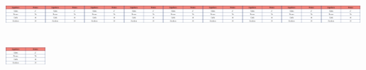 \includegraphics[width=0.57930in,height=0.57462in]{media/image121.png}\includegraphics[width=0.57930in,height=0.57462in]{media/image121.png}\includegraphics[width=0.57930in,height=0.57462in]{media/image121.png}\includegraphics[width=0.57930in,height=0.57462in]{media/image121.png}\includegraphics[width=0.57930in,height=0.57462in]{media/image121.png}\includegraphics[width=0.57930in,height=0.57462in]{media/image121.png}\includegraphics[width=0.57930in,height=0.57462in]{media/image121.png}\includegraphics[width=0.57930in,height=0.57462in]{media/image121.png}\includegraphics[width=0.57930in,height=0.57462in]{media/image121.png}\includegraphics[width=0.57930in,height=0.57462in]{media/image121.png}

